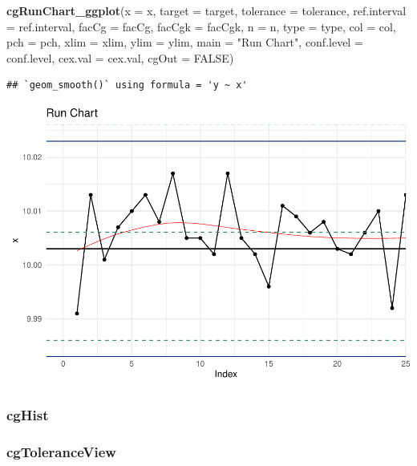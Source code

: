 \documentclass[
]{book}
\newenvironment{Shaded}{\begin{snugshade}}{\end{snugshade}}
\newcommand{\AttributeTok}[1]{\textcolor[rgb]{0.13,0.29,0.53}{#1}}
\newcommand{\ConstantTok}[1]{\textcolor[rgb]{0.56,0.35,0.01}{#1}}
\newcommand{\FunctionTok}[1]{\textcolor[rgb]{0.13,0.29,0.53}{\textbf{#1}}}
\newcommand{\NormalTok}[1]{#1}
\newcommand{\StringTok}[1]{\textcolor[rgb]{0.31,0.60,0.02}{#1}}
\begin{document}
\begin{Shaded}
\begin{Highlighting}[]
\FunctionTok{cgRunChart\_ggplot}\NormalTok{(}\AttributeTok{x =}\NormalTok{ x, }\AttributeTok{target =}\NormalTok{ target, }\AttributeTok{tolerance =}\NormalTok{ tolerance, }
                    \AttributeTok{ref.interval =}\NormalTok{ ref.interval, }\AttributeTok{facCg =}\NormalTok{ facCg, }\AttributeTok{facCgk =}\NormalTok{ facCgk, }
                    \AttributeTok{n =}\NormalTok{ n, }\AttributeTok{type =}\NormalTok{ type, }\AttributeTok{col =}\NormalTok{ col, }\AttributeTok{pch =}\NormalTok{ pch, }\AttributeTok{xlim =}\NormalTok{ xlim, }
                    \AttributeTok{ylim =}\NormalTok{ ylim, }\AttributeTok{main =} \StringTok{"Run Chart"}\NormalTok{, }\AttributeTok{conf.level =}\NormalTok{ conf.level, }
                    \AttributeTok{cex.val =}\NormalTok{ cex.val, }\AttributeTok{cgOut =} \ConstantTok{FALSE}\NormalTok{)}
\end{Highlighting}
\end{Shaded}

\begin{verbatim}
## `geom_smooth()` using formula = 'y ~ x'
\end{verbatim}

\includegraphics{Libro_TidyQualityTools_files/figure-latex/unnamed-chunk-144-1.pdf}

\hypertarget{cghist}{%
\subsubsection{cgHist}\label{cghist}}

\hypertarget{cgtoleranceview}{%
\subsubsection{cgToleranceView}\label{cgtoleranceview}}
\end{document}
